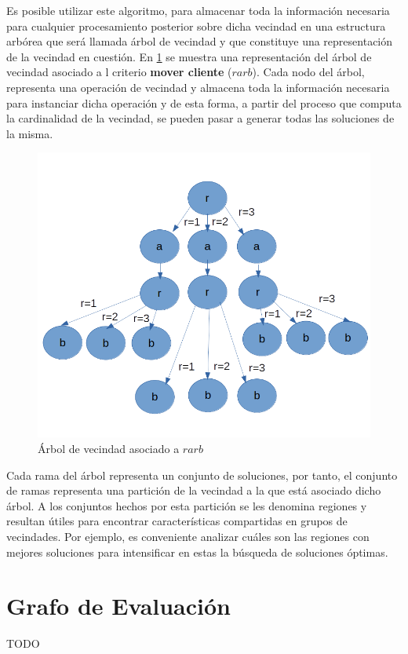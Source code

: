 Es posible utilizar este algoritmo, para almacenar toda la información
necesaria para cualquier procesamiento posterior sobre dicha vecindad en
una estructura arbórea que será llamada árbol de vecindad y que constituye
una representación de la vecindad en cuestión. En \ref{fig:neigh-tree} se muestra una representación del árbol de vecindad asociado a l criterio \textbf{mover cliente} ($rarb$). Cada nodo del árbol, representa una
operación de vecindad y almacena toda la información necesaria para instanciar dicha operación y de esta forma, a partir del proceso que computa
la cardinalidad de la vecindad, se pueden pasar a generar todas las soluciones de la misma.


\begin{figure}
	\centering
	\includegraphics[width=0.9\linewidth]{Graphics/Neigh-Tree}
	\caption{Árbol de vecindad asociado a $rarb$}
	\label{fig:neigh-tree}
\end{figure}

Cada rama del árbol representa un conjunto de soluciones, por tanto, el conjunto de ramas representa una partición de la vecindad a la que está asociado dicho árbol. A los conjuntos hechos por esta partición se les denomina regiones y resultan útiles para encontrar características compartidas en grupos de vecindades. Por ejemplo, es conveniente analizar cuáles son las regiones con mejores soluciones para intensificar en estas la búsqueda de soluciones óptimas.

\section{Grafo de Evaluación}\label{2-JJ}
TODO

